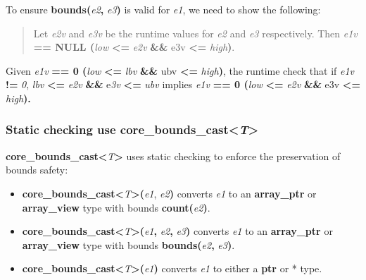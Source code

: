\documentclass[]{article}
\begin{document}
To ensure \textbf{bounds(}\emph{e2}\textbf{,} \emph{e3}\textbf{)} is
valid for \emph{e1}, we need to show the following:

\begin{quote}
Let \emph{e2v} and \emph{e3v} be the runtime values for \emph{e2} and
\emph{e3} respectively. Then \emph{e1v} \textbf{== NULL
\textbar{}\textbar{} (}\emph{low} \textbf{\textless{}=} \emph{e2v}
\textbf{\&\&} e3v \textbf{\textless{}=} \emph{high}\textbf{)}.
\end{quote}

Given \emph{e1v} \textbf{== 0 \textbar{}\textbar{} (}\emph{low}
\textbf{\textless{}=} \emph{lbv} \textbf{\&\&} ubv \textbf{\textless{}=}
\emph{high}\textbf{)}, the runtime check that if \emph{e1v} \textbf{!=}
\emph{0}, \emph{lbv} \textbf{\textless{}=} \emph{e2v} \textbf{\&\&}
e\emph{3v} \textbf{\textless{}=} \emph{ubv} implies \emph{e1v}
\textbf{== 0 \textbar{}\textbar{} (}\emph{low} \textbf{\textless{}=}
\emph{e2v} \textbf{\&\&} e3v \textbf{\textless{}=}
\emph{high}\textbf{).}

\subsubsection{\texorpdfstring{\protect\hypertarget{ux5fToc437460799}{}{\protect\hypertarget{ux5fToc440445480}{}{\protect\hypertarget{ux5fToc440449262}{}{\protect\hypertarget{ux5fToc440551912}{}{}}}}Static
checking use
core\_bounds\_cast\textless{}\emph{T}\textgreater{}}{Static checking use core\_bounds\_cast\textless{}T\textgreater{}}}\label{static-checking-use-coreux5fboundsux5fcastt}

\textbf{core\_bounds\_cast\textless{}}\emph{T}\textbf{\textgreater{}}
uses static checking to enforce the preservation of bounds safety:

\begin{itemize}
\item
  \textbf{core\_bounds\_cast\textless{}}\emph{T}\textbf{\textgreater{}(}\emph{e1},
  \emph{e2}\textbf{)} converts \emph{e1} to an \textbf{array\_ptr} or
  \textbf{array\_view} type with bounds
  \textbf{count(}\emph{e2}\textbf{)}.
\item
  \textbf{core\_bounds\_cast\textless{}}\emph{T}\textbf{\textgreater{}(}\emph{e1}\textbf{,}
  \emph{e2}\textbf{,} \emph{e3}\textbf{)} converts \emph{e1} to an
  \textbf{array\_ptr} or \textbf{array\_view} type with bounds
  \textbf{bounds(}\emph{e2}\textbf{,} \emph{e3}\textbf{)}.
\item
  \textbf{core\_bounds\_cast\textless{}}\emph{T}\textbf{\textgreater{}(}\emph{e1}\textbf{)}
  converts \emph{e1} to either a \textbf{ptr} or * type.
\end{itemize}
\end{document}
